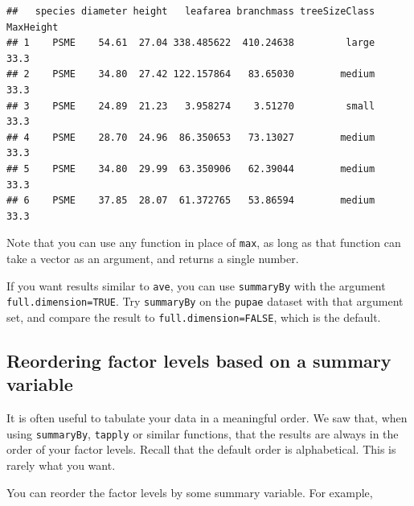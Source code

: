\documentclass[]{book}
\newenvironment{Shaded}{\begin{snugshade}}{\end{snugshade}}
\newcommand{\CommentTok}[1]{\textcolor[rgb]{0.56,0.35,0.01}{\textit{#1}}}
\newcommand{\KeywordTok}[1]{\textcolor[rgb]{0.13,0.29,0.53}{\textbf{#1}}}
\newcommand{\NormalTok}[1]{#1}
\newcommand{\OperatorTok}[1]{\textcolor[rgb]{0.81,0.36,0.00}{\textbf{#1}}}
\let\BeginKnitrBlock\begin \let\EndKnitrBlock\end
\begin{document}
\begin{verbatim}
##   species diameter height   leafarea branchmass treeSizeClass MaxHeight
## 1    PSME    54.61  27.04 338.485622  410.24638         large      33.3
## 2    PSME    34.80  27.42 122.157864   83.65030        medium      33.3
## 3    PSME    24.89  21.23   3.958274    3.51270         small      33.3
## 4    PSME    28.70  24.96  86.350653   73.13027        medium      33.3
## 5    PSME    34.80  29.99  63.350906   62.39044        medium      33.3
## 6    PSME    37.85  28.07  61.372765   53.86594        medium      33.3
\end{verbatim}

Note that you can use any function in place of \texttt{max}, as long as that function can take a vector as an argument, and returns a single number.

\BeginKnitrBlock{rmdtry}
If you want results similar to \texttt{ave}, you can use \texttt{summaryBy} with the argument \texttt{full.dimension=TRUE}. Try \texttt{summaryBy} on the \texttt{pupae} dataset with that argument set, and compare the result to \texttt{full.dimension=FALSE}, which is the default.
\EndKnitrBlock{rmdtry}

\hypertarget{reorder}{%
\subsection{Reordering factor levels based on a summary variable}\label{reorder}}

It is often useful to tabulate your data in a meaningful order. We saw that, when using \texttt{summaryBy}, \texttt{tapply} or similar functions, that the results are always in the order of your factor levels. Recall that the default order is alphabetical. This is rarely what you want.

You can reorder the factor levels by some summary variable. For example,

\begin{Shaded}
\end{Shaded}
\end{document}
